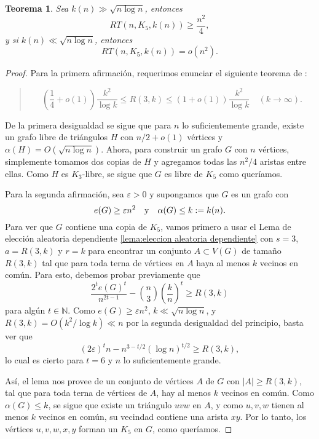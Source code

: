 \documentclass[12pt]{report}
\theoremstyle{plain}
\newtheorem{theorem}{Teorema}[section]
\theoremstyle{definition}
\newcommand{\naturals}{\mathbb{N}}
\newcommand{\abs}[1]{\left \vert #1 \right \vert}
\begin{document}
\begin{theorem}
Sea $k(n) \gg \sqrt{n \log n}$, entonces
\[
    RT (n, K_5, k(n)) \geq \frac{n^2}{4},
\]
y si $k(n) \ll \sqrt{n \log n}$, entonces
\[
    RT (n, K_5 , k(n)) = o (n^2).
\]
\end{theorem}
\begin{proof}
Para la primera afirmación, requerimos enunciar el siguiente teorema de \cite[Teorema 9.2.8]{botler2022combinatoria}:
\begin{quote}
\[
    \left ( \frac 1 4 + o (1 ) \right ) \frac{k^2}{\log k} \leq R(3, k) \leq (1 + o (1)) \frac{k^2}{\log k} \quad (k \to \infty).
\]
\end{quote}
De la primera desigualdad se sigue que para $n$ lo suficientemente grande, existe un grafo libre de triángulos $H$ con $n/2 + o(1)$ vértices y $\alpha (H) = O (\sqrt{n \log n})$. Ahora, para construir un grafo $G$ con $n$ vértices, simplemente tomamos dos copias de $H$ y agregamos todas las $n^2/4$ aristas entre ellas. Como $H$ es $K_3$-libre, se sigue que $G$ es libre de $K_5$ como queríamos.

Para la segunda afirmación, sea $\varepsilon > 0$ y supongamos que $G$ es un grafo con
\[
e(G) \geq \varepsilon n^2 \quad \text y \quad \alpha (G) \leq k := k(n).
\]
Para ver que $G$ contiene una copia de $K_5$, vamos primero a usar el Lema de elección aleatoria dependiente \ref{lema:eleccion aleatoria dependiente} con $s = 3$, $a = R(3,k)$ y $r = k$ para encontrar un conjunto $A \subset V(G)$ de tamaño $R(3,k)$ tal que para toda terna de vértices en $A$ haya al menos $k$ vecinos en común. Para esto, debemos probar previamente que
\[
\frac{2^t e(G)^t}{n^{2t - 1}} - \binom n 3 \left ( \frac k n \right )^t \geq R(3, k)
\]
para algún $t \in \naturals$. Como $e(G) \geq \varepsilon n^2$, $k \ll \sqrt{n \log n}$, y $R(3,k) = O (k^2 / \log k) \ll n$ por la segunda desigualdad del principio, basta ver que
\[
    (2 \varepsilon)^t n - n^{3- t/2} (\log n)^{t/2} \geq R(3, k),
\]
lo cual es cierto para $t = 6$ y $n$ lo suficientemente grande.

Así, el lema nos provee de un conjunto de vértices $A$ de $G$ con $\abs A \geq R(3,k)$, tal que para toda terna de vértices de $A$, hay al menos $k$ vecinos en común. Como $\alpha (G) \leq k$, se sigue que existe un triángulo $uvw$ en $A$, y como $u,v,w$ tienen al menos $k$ vecinos en común, su vecindad contiene una arista $xy$. Por lo tanto, los vértices $u,v,w,x,y$ forman un $K_5$ en $G$, como queríamos.
\end{proof}
\end{document}
